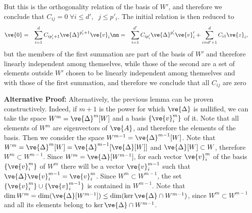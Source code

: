But this is the orthogonality relation of the basis of $W'$, and therefore
we conclude that $C_{ij}=0\;\forall i \leq d',\;\; j \leq p'_i$.
The initial relation is then reduced to 
\begin{eqnarray}
  \ve{0} &=& \sum_{i=1}^d  C_{ip'_i+1}\ve{\Delta}^{p'_i+1}\ve{v}_i \nn 
         &=& \sum_{i=1}^{d'} C_{ip'_i}\ve{\Delta}^{p'_i}\ve{v}'_i 
           + \sum_{i=d'+1}^{d} C_{i1}\ve{z}_i,
\end{eqnarray}
but the members of the first summation are part of the basis of $W'$ and therefore
linearly independent among themselves, while those of the second are a set
of elements outside $W'$ chosen to be linearly independent among themselves and with those of the
first summation, and therefore we conclude that all $C_{ij}$ are zero 
\epru
\espa
%

\textbf{Alternative Proof:}
%
Alternatively, the previous lemma can be proven constructively. 
Indeed, if $m+1$ is the power for which $\ve{\Delta}$ is nullified, 
we can take the space
$W^m = \ve{\Delta}^m[W]$ and a basis $\{\ve{v}^m_i\}$ of it. Note that all elements of 
$W^m$ are eigenvectors of $\ve{A}$, and therefore the elements of the basis.
Then we consider the space $W^{m-1} = \ve{\Delta}^{m-1}[W]$. 
Note that $W^{m} = \ve{\Delta}^m[W] = \ve{\Delta}^{m-1}[\ve{\Delta}[W]]$ and $\ve{\Delta}[W] \subset W$, 
therefore $W^{m} \subset W^{m-1}$.
Since $W^{m} = \ve{\Delta}[W^{m-1}]$,
for each vector $\ve{v}^{m}_i$ of the basis $\{\ve{v}^m_i\}$ of $W^m$ 
there will be a vector $\ve{v}^{m-1}_i$ such that $\ve{\Delta} \ve{v}^{m-1}_i = \ve{v}^m_i$.
Since $W^{m} \subset W^{m-1}$, the set $\{\ve{v}^m_i\} \cup \{\ve{v}^{m-1}_i\}$
is contained in $W^{m-1}$. 
Note that 
$\dim W^m = \dim (\ve{\Delta}[W^{m-1}]) \leq  \dim (\ker \ve{\Delta} \cap W^{m-1})$,
since $W^m \subset W^{m-1}$ and all its elements belong to $\ker \ve{\Delta} \cap W^{m-1}$.

